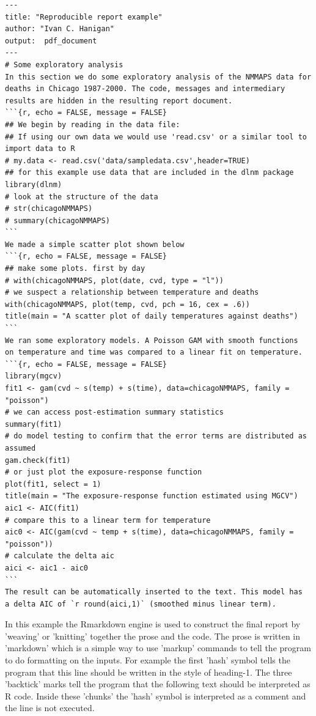 \documentclass[11pt,a4paper]{article}
\newenvironment{Shaded}{\begin{snugshade}}{\end{snugshade}}
\begin{document}
\begin{singlespace}
\begin{Shaded}
\begin{verbatim}
---
title: "Reproducible report example"
author: "Ivan C. Hanigan"
output:  pdf_document
---
# Some exploratory analysis
In this section we do some exploratory analysis of the NMMAPS data for
deaths in Chicago 1987-2000. The code, messages and intermediary
results are hidden in the resulting report document.
```{r, echo = FALSE, message = FALSE}
## We begin by reading in the data file:
## If using our own data we would use 'read.csv' or a similar tool to import data to R
# my.data <- read.csv('data/sampledata.csv',header=TRUE)
## for this example use data that are included in the dlnm package
library(dlnm)
# look at the structure of the data
# str(chicagoNMMAPS)
# summary(chicagoNMMAPS)
```
We made a simple scatter plot shown below
```{r, echo = FALSE, message = FALSE}
## make some plots. first by day
# with(chicagoNMMAPS, plot(date, cvd, type = "l"))
# we suspect a relationship between temperature and deaths
with(chicagoNMMAPS, plot(temp, cvd, pch = 16, cex = .6))
title(main = "A scatter plot of daily temperatures against deaths")
```
We ran some exploratory models. A Poisson GAM with smooth functions
on temperature and time was compared to a linear fit on temperature.
```{r, echo = FALSE, message = FALSE}
library(mgcv)
fit1 <- gam(cvd ~ s(temp) + s(time), data=chicagoNMMAPS, family = "poisson")
# we can access post-estimation summary statistics
summary(fit1)
# do model testing to confirm that the error terms are distributed as assumed
gam.check(fit1)
# or just plot the exposure-response function
plot(fit1, select = 1)
title(main = "The exposure-response function estimated using MGCV")
aic1 <- AIC(fit1)
# compare this to a linear term for temperature
aic0 <- AIC(gam(cvd ~ temp + s(time), data=chicagoNMMAPS, family = "poisson"))
# calculate the delta aic
aici <- aic1 - aic0
```
The result can be automatically inserted to the text. This model has
a delta AIC of `r round(aici,1)` (smoothed minus linear term).
\end{verbatim}
\end{Shaded}
\end{singlespace}

In this example the Rmarkdown engine is used to construct the final report by 'weaving' or 'knitting' together the prose and the code.  The prose is written in 'markdown' which is a simple way to use 'markup' commands to tell the program to do formatting on the inputs.  For example the first 'hash' symbol tells the program that this line should be written in the style of heading-1.  The three 'backtick' marks tell the program that the following text should be interpreted as R code.  Inside these 'chunks' the 'hash' symbol is interpreted as a comment and the line is not executed.
\end{document}
